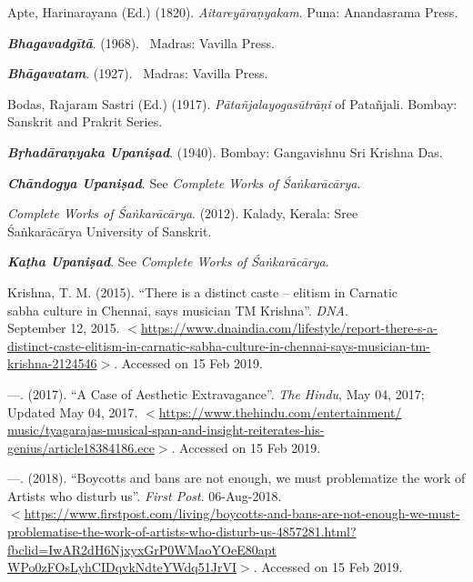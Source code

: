 \begin{thebibliography}{99}
\itemsep=1pt

  Apte, Harinarayana (Ed.) (1820). \textit{Aitareyāraṇyakam}. Puna: Anandasrama Press.

  \textbf{\textit{Bhagavadgītā}}. (1968).  Madras: Vavilla Press.

  \textbf{\textit{Bhāgavatam}}. (1927).  Madras: Vavilla Press.

  Bodas, Rajaram Sastri (Ed.) (1917). \textit{Pātañjalayogasūtrāṇi} of Patañjali. Bombay: Sanskrit and Prakrit Series.

  \textbf{\textit{Bṛhadāraṇyaka Upaniṣad}}. (1940). Bombay: Gangavishnu Sri Krishna Das.

  \textbf{\textit{Chāndogya Upaniṣad}}. See \textit{Complete Works of Śaṅkarācārya}.

  \textit{Complete Works of Śaṅkarācārya}. (2012). Kalady, Kerala: Sree\\ Śaṅkarācārya University of Sanskrit.

  \textbf{\textit{Kaṭha Upaniṣad}}. See \textit{Complete Works of Śaṅkarācārya}.

  Krishna, T. M. (2015). “There is a distinct caste – elitism in Carnatic\\ sabha culture in Chennai, says musician TM Krishna”. \textit{DNA}.\\ September 12, 2015. $<$\url{https://www.dnaindia.com/lifestyle/report-there-s-a-distinct-caste-elitism-in-carnatic-sabha-culture-in-chennai-says-musician-tm-krishna-2124546}$>$. Accessed on 15 Feb 2019.

  —. (2017). “A Case of Aesthetic Extravagance”. \textit{The Hindu}, May 04, 2017;\\ Updated May 04, 2017. $<$\url{https://www.thehindu.com/entertainment/ music/tyagarajas-musical-span-and-insight-reiterates-his-genius/article18384186.ece}$>$.  Accessed on 15 Feb 2019.

  —. (2018). “Boycotts and bans are not enough, we must problematize the work of Artists who disturb us”. \textit{First Post}. 06-Aug-2018.\\ $<$\url{https://www.firstpost.com/living/boycotts-and-bans-are-not-enough-we-must-problematise-the-work-of-artists-who-disturb-us-4857281.html?fbclid=IwAR2dH6NjxyxGrP0WMaoYOeE80apt WPo0zFOsLyhCIDqvkNdteYWdq51JrVI}$>$. Accessed on 15 Feb 2019.


\end{thebibliography}
